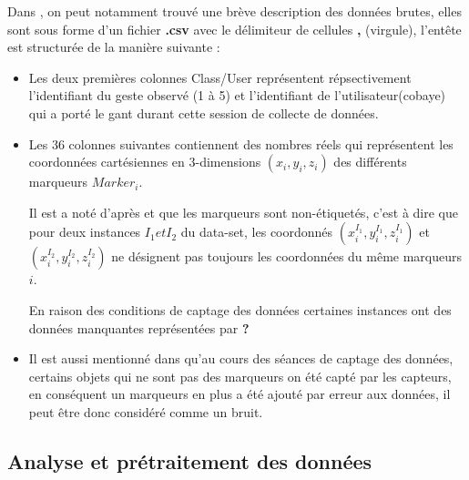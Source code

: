 \par 
Dans \cite{dataset}, on peut notamment trouvé une brève description des données brutes, elles sont sous forme d'un fichier \textbf{.csv} avec le délimiteur de cellules \textbf{,} (virgule), l'entête est structurée  de la manière suivante :
\begin{itemize}
	\item Les deux premières colonnes Class/User représentent répsectivement l'identifiant du geste observé (1 à 5) et l'identifiant de l'utilisateur(cobaye) qui a porté le gant durant cette session de collecte de données.
	\item Les 36 colonnes suivantes contiennent des nombres réels qui représentent les coordonnées cartésiennes en 3-dimensions $(x_i,y_i,z_i)$ des différents marqueurs $Marker_i$. \par Il est a noté d'après \cite{datasetDetails} et \cite{dataset} que les marqueurs sont non-étiquetés, c'est à dire que pour deux instances $I_1 et I_2$ du data-set, les coordonnés $(x_i^{I_1},y_i^{I_1},z_i^{I_1})$ et $(x_i^{I_2},y_i^{I_2},z_i^{I_2})$ ne désignent pas toujours les coordonnées du même marqueurs $i$. \par En raison des conditions de captage des données certaines instances ont des données manquantes représentées par \textbf{?}
	\item Il est aussi mentionné dans \cite{datasetDetails} qu'au cours des séances de captage des données, certains objets qui ne sont pas des marqueurs on été capté par les capteurs, en conséquent un marqueurs en plus a été ajouté par erreur aux données, il peut être donc considéré comme un bruit.\label{noise}
\end{itemize}
\subsection{Analyse et prétraitement des données}\label{dataAnalysis}
